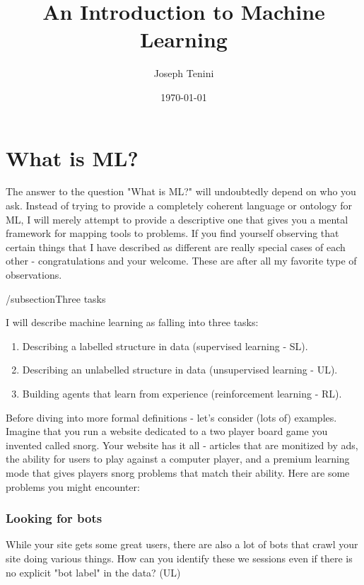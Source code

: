 \documentclass{article}
\title{An Introduction to Machine Learning}
\author{Joseph Tenini}
\date{\today}
\begin{document}
\maketitle

\section{What is ML?}

The answer to the question "What is ML?" will undoubtedly depend on who you ask. Instead of trying to provide a completely coherent language or ontology for ML, I will merely attempt to provide a descriptive one that gives you a mental framework for mapping tools to problems. If you find yourself observing that certain things that I have described as different are really special cases of each other - congratulations and your welcome. These are after all my favorite type of observations.

/subsection{Three tasks}

I will describe machine learning as falling into three tasks:

\begin{enumerate}
    \item Describing a labelled structure in data (supervised learning - SL).
    \item Describing an unlabelled structure in data (unsupervised learning - UL).
    \item Building agents that learn from experience (reinforcement learning - RL).
\end{enumerate}


Before diving into more formal definitions - let's consider (lots of) examples. Imagine that you run a website dedicated to a two player board game you invented called snorg. Your website has it all - articles that are monitized by ads, the ability for users to play against a computer player, and a premium learning mode that gives players snorg problems that match their ability. Here are some problems you might encounter:

\subsubsection{Looking for bots}

While your site gets some great users, there are also a lot of bots that crawl your site doing various things. How can you identify these we sessions even if there is no explicit "bot label" in the data? (UL)
\end{document}
